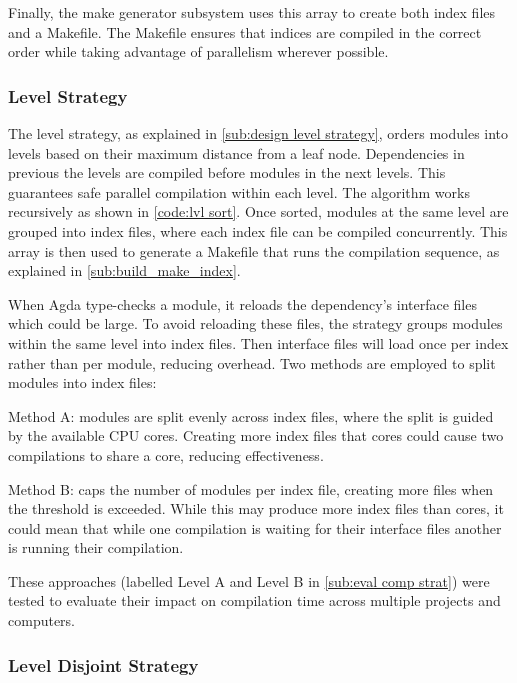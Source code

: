 Finally, the make generator subsystem uses this array to create both index
files and a Makefile. The Makefile ensures that indices are compiled in the
correct order while taking advantage of parallelism wherever possible.

\subsubsection{Level Strategy} \label{sub:imp lvl strategy}

The level strategy, as explained in \cref{sub:design level strategy}, orders
modules into levels based on their maximum distance from a leaf node.
Dependencies in previous the levels are compiled before modules in the next
levels. This guarantees safe parallel compilation within each level. The
algorithm works recursively as shown in \cref{code:lvl sort}. Once sorted,
modules at the same level are grouped into index files, where each index file
can be compiled concurrently. This array is then used to generate a Makefile
that runs the compilation sequence, as explained in
\cref{sub:build_make_index}.

When Agda type-checks a module, it reloads the dependency's interface files
which could be large. To avoid reloading these files, the strategy groups
modules within the same level into index files. Then interface files will load
once per index rather than per module, reducing overhead. Two methods are
employed to split modules into index files:

Method A: modules are split evenly across index files, where the split is
guided by the available CPU cores. Creating more index files  that cores could
cause two compilations to share a core, reducing effectiveness.

Method B: caps the number of modules per index file, creating more files when
the threshold is exceeded. While this may produce more index files than cores,
it could mean that while one compilation is waiting for their interface files
another is running their compilation. 

These approaches (labelled Level A and Level B in \cref{sub:eval comp strat})
were tested to evaluate their impact on compilation time across multiple
projects and computers.

\subsubsection{Level Disjoint Strategy} \label{sub:imp disj strategy}

